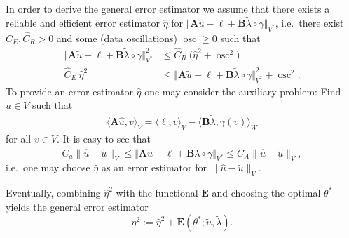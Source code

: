 \documentclass[12pt,twoside,reqno]{amsart}
\theoremstyle{definition}
\numberwithin{equation}{section}
\newcommand{\A} {\bm{A}}
\newcommand{\lin} {\bm{\ell}}
\newcommand{\B} {\bm{B}}
\newcommand{\E} {\bm{E}}
\newcommand{\norm}[1]    {\Vert #1 \Vert}
\begin{document}
In order to derive the general error estimator
we assume that there exists a reliable and efficient error estimator $\hat{\eta}$ for $\norm{\A \tilde{u}-\lin+\B\tilde{\lambda}\circ\gamma}_{V^*}$, i.e.~there exist $\widehat{C}_E,\widehat{C}_R>0$ and some (data oscillations) $\operatorname{osc}\geq 0$ such that
%
    \begin{subequations}\label{Hilfschaetzer}
        \begin{align}
             \norm{\A \tilde{u}-\lin+\B\tilde{\lambda}\circ\gamma}_{V^*}^2&\leq \widehat{C}_R\:\big(\hat{\eta}^2+\operatorname{osc}^2\big)\label{Hilfsschaetzer Zuverlässig} \\
            \widehat{C}_E\:\hat{\eta}^2&\leq \norm{\A \tilde{u}-\lin+\B\tilde{\lambda}\circ\gamma}_{V^*}^2+\operatorname{osc}^2.\label{Hilfsschaetzer Effizienz}
        \end{align}
    \end{subequations}
      To provide an error estimator $\hat{\eta}$ one may consider the 
    auxiliary problem: Find $\hat{u}\in V$ such that 
    \begin{align} \label{Auxiliary Problem}
    \langle \A \hat{u},v \rangle_V = \langle \lin, v\rangle_V - \langle \B\tilde{\lambda}, \gamma(v) \rangle_W
    \end{align}
    for all $v \in V$.  It is easy to see that
    \[
        C_a \|\hat{u}-\tilde{u}\|_V  \leq \norm{\A \tilde{u}-\lin+\B\tilde{\lambda}\circ\gamma}_{V^*}\leq C_A \|\hat{u}-\tilde{u}\|_V,
    \]
    i.e.~one may choose $\hat{\eta}$ as an error estimator for $\|\hat{u}-\tilde{u}\|_V$.

     Eventually, combining $\hat{\eta}^2$ with the functional $\E$ and choosing the optimal $\theta^*$ yields the general error estimator
     \begin{equation*}
          \eta^2:=\hat{\eta}^2+\E(\theta^*;\tilde{u},\tilde{\lambda}).
    \end{equation*}
    
\end{document}
